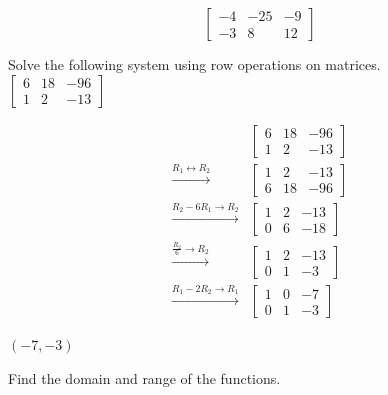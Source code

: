 \documentclass[addpoints]{exam}
\begin{document}
\begin{questions}
\begin{solution}
\[\boxed{ \left[\begin{array}{cc|c} -4 & -25 & -9 \\ -3 & 8 & 12 \end{array}\right] }\]
\end{solution}

\question[6] Solve the following system using row operations on matrices.\\
    
\(\displaystyle{ \left[\begin{array}{cc|c} 6 & 18 & -96 \\ 1 & 2 & -13 \end{array}\right] }\)
\begin{solution}
\[\begin{aligned} & \left[\begin{array}{cc|c} 6 & 18 & -96 \\ 1 & 2 & -13 \end{array}\right] \\ \xrightarrow{R_1 \leftrightarrow R_2} & \left[\begin{array}{cc|c} 1 & 2 & -13 \\ 6 & 18 & -96 \end{array}\right] \\ \xrightarrow{R_2 - 6R_1 \to R_2} & \left[\begin{array}{cc|c} 1 & 2 & -13 \\ 0 & 6 & -18 \end{array}\right] \\ \xrightarrow{\frac{R_2}{6} \to R_2} & \left[\begin{array}{cc|c} 1 & 2 & -13 \\ 0 & 1 & -3 \end{array}\right] \\ \xrightarrow{R_1 - 2R_2 \to R_1} & \left[\begin{array}{cc|c} 1 & 0 & -7 \\ 0 & 1 & -3 \end{array}\right] \end{aligned}\]

\(\boxed{ (-7, -3) }\)
\end{solution}
\answerline
\newpage

\question Find the domain and range of the functions.
\end{questions}
\end{document}
